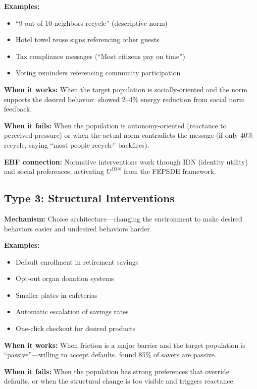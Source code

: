 \textbf{Examples:}
\begin{itemize}[nosep]
\item ``9 out of 10 neighbors recycle'' (descriptive norm)
\item Hotel towel reuse signs referencing other guests
\item Tax compliance messages (``Most citizens pay on time'')
\item Voting reminders referencing community participation
\end{itemize}

\textbf{When it works:} When the target population is socially-oriented and the norm supports the desired behavior. \citet{allcott2011} showed 2--4\% energy reduction from social norm feedback.

\textbf{When it fails:} When the population is autonomy-oriented (reactance to perceived pressure) or when the actual norm contradicts the message (if only 40\% recycle, saying ``most people recycle'' backfires).

\textbf{EBF connection:} Normative interventions work through IDN (identity utility) and social preferences, activating $U^{IDN}$ from the FEPSDE framework.

\subsection{Type 3: Structural Interventions}

\textbf{Mechanism:} Choice architecture---changing the environment to make desired behaviors easier and undesired behaviors harder.

\textbf{Examples:}
\begin{itemize}[nosep]
\item Default enrollment in retirement savings \citep{madrian2001}
\item Opt-out organ donation systems
\item Smaller plates in cafeterias
\item Automatic escalation of savings rates
\item One-click checkout for desired products
\end{itemize}

\textbf{When it works:} When friction is a major barrier and the target population is ``passive''---willing to accept defaults. \citet{chetty2014} found 85\% of savers are passive.

\textbf{When it fails:} When the population has strong preferences that override defaults, or when the structural change is too visible and triggers reactance.

